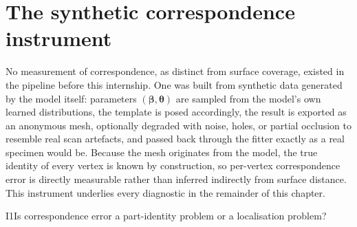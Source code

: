 \section{The synthetic correspondence instrument}
\label{sec:synthetic-instrument}

No measurement of correspondence, as distinct from surface coverage, existed
in the pipeline before this internship. One was built from synthetic data
generated by the model itself: parameters $(\bm\beta, \bm\theta)$ are sampled
from the model's own learned distributions, the template is posed
accordingly, the result is exported as an anonymous mesh, optionally
degraded with noise, holes, or partial occlusion to resemble real scan
artefacts, and passed back through the fitter exactly as a real specimen
would be. Because the mesh originates from the model, the true identity of
every vertex is known by construction, so per-vertex correspondence error is
directly measurable rather than inferred indirectly from surface distance.
This instrument underlies every diagnostic in the remainder of this chapter.

\begin{investigation}{I1}{Is correspondence error a part-identity problem or a localisation problem?}
\end{investigation}
